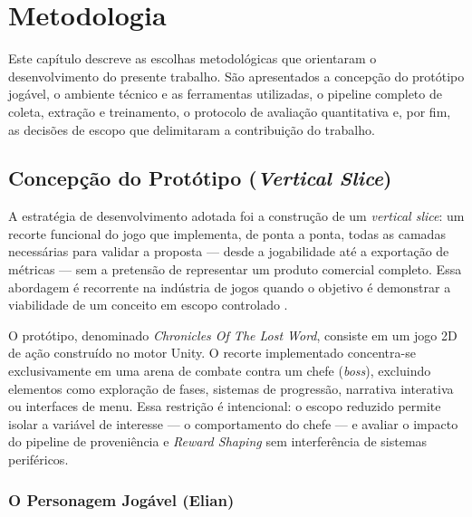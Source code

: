 \chapter{Metodologia}
\label{cap:metodologia}

Este capítulo descreve as escolhas metodológicas que orientaram o
desenvolvimento do presente trabalho. São apresentados a concepção do
protótipo jogável, o ambiente técnico e as ferramentas utilizadas, o
pipeline completo de coleta, extração e treinamento, o protocolo de avaliação
quantitativa e, por fim, as decisões de escopo que delimitaram a contribuição
do trabalho.

\section{Concepção do Protótipo (\textit{Vertical Slice})}
\label{sec:vertical-slice}

A estratégia de desenvolvimento adotada foi a construção de um
\textit{vertical slice}: um recorte funcional do jogo que implementa, de
ponta a ponta, todas as camadas necessárias para validar a proposta --- desde
a jogabilidade até a exportação de métricas --- sem a pretensão de representar
um produto comercial completo. Essa abordagem é recorrente na indústria de
jogos quando o objetivo é demonstrar a viabilidade de um conceito em escopo
controlado \cite{yannakakis2018artificial}.

O protótipo, denominado \textit{Chronicles Of The Lost Word}, consiste em um
jogo 2D de ação construído no motor Unity. O recorte implementado concentra-se
exclusivamente em uma arena de combate contra um chefe (\textit{boss}),
excluindo elementos como exploração de fases, sistemas de progressão,
narrativa interativa ou interfaces de menu. Essa restrição é intencional: o
escopo reduzido permite isolar a variável de interesse --- o comportamento do
chefe --- e avaliar o impacto do pipeline de proveniência e \textit{Reward
Shaping} sem interferência de sistemas periféricos.

\subsection{O Personagem Jogável (Elian)}
\label{subsec:elian}

